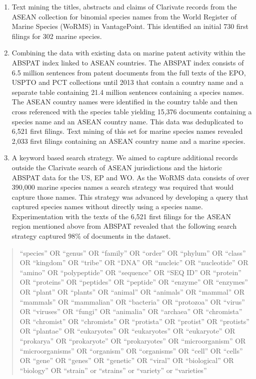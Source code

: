 \documentclass[]{book}
\theoremstyle{definition}
\theoremstyle{definition}
\theoremstyle{definition}
\theoremstyle{remark}
\begin{document}
\begin{enumerate}
\def\labelenumi{\alph{enumi})}
\item
  Text mining the titles, abstracts and claims of Clarivate records from
  the ASEAN collection for binomial species names from the World
  Register of Marine Species (WoRMS) in VantagePoint. This identified an
  initial 730 first filings for 302 marine species.
\item
  Combining the data with existing data on marine patent activity within
  the ABSPAT index linked to ASEAN countries. The ABSPAT index consists
  of 6.5 million sentences from patent documents from the full texts of
  the EPO, USPTO and PCT collections until 2013 that contain a country
  name and a separate table containing 21.4 million sentences containing
  a species names. The ASEAN country names were identified in the
  country table and then cross referenced with the species table
  yielding 15,376 documents containing a species name and an ASEAN
  country name. This data was deduplicated to 6,521 first filings. Text
  mining of this set for marine species names revealed 2,033 first
  filings containing an ASEAN country name and a marine species.
\item
  A keyword based search strategy. We aimed to capture additional
  records outside the Clarivate search of ASEAN jurisdictions and the
  historic ABSPAT data for the US, EP and WO. As the WoRMS data consists
  of over 390,000 marine species names a search strategy was required
  that would capture those names. This strategy was advanced by
  developing a query that captured species names without directly using
  a species name. Experimentation with the texts of the 6,521 first
  filings for the ASEAN region mentioned above from ABSPAT revealed that
  the following search strategy captured 98\% of documents in the
  dataset.
\end{enumerate}

\begin{quote}
``species'' OR ``genus'' OR ``family'' OR ``order'' OR ``phylum'' OR
``class'' OR ``kingdom'' OR ``tribe'' OR ``DNA'' OR ``nucleic'' OR
``nucleotide'' OR ``amino'' OR ``polypeptide'' OR ``sequence'' OR ``SEQ
ID'' OR ``protein'' OR ``proteins'' OR ``peptides'' OR ``peptide'' OR
``enzyme'' OR ``enzymes'' OR ``plant'' OR ``plants'' OR ``animal'' OR
``animals'' OR ``mammal'' OR ``mammals'' OR ``mammalian'' OR
``bacteria'' OR ``protozoa'' OR ``virus'' OR ``viruses'' OR ``fungi'' OR
``animalia'' OR ``archaea'' OR ``chromista'' OR ``chromist'' OR
``chromists'' OR ``protista'' OR ``protist'' OR ``protists'' OR
``plantae'' OR ``eukaryotes'' OR ``eukaryotes'' OR ``eukaryote'' OR
``prokarya'' OR ``prokaryote'' OR ``prokaryotes'' OR ``microorganism''
OR ``microorganisms'' OR ``organism'' OR ``organisms'' OR ``cell'' OR
``cells'' OR ``gene'' OR ``genes'' OR ``genetic'' OR ``viral'' OR
``biological'' OR ``biology'' OR ``strain'' or ``strains'' or
``variety'' or ``varieties''
\end{quote}
\end{document}
